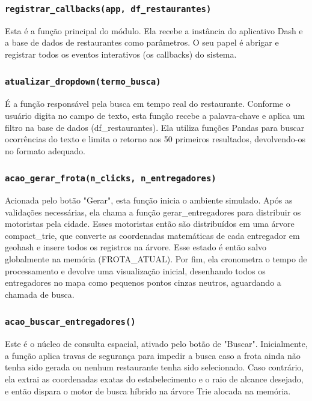 \documentclass[12pt,a4paper]{article}
\begin{document}
\subsubsection{\texttt{registrar\_callbacks(app, df\_restaurantes)}}
Esta é a função principal do módulo. Ela recebe a instância do aplicativo Dash e a base de dados de restaurantes como parâmetros. O seu papel é abrigar e registrar todos os eventos interativos (os callbacks) do sistema.

\subsubsection{\texttt{atualizar\_dropdown(termo\_busca)}}
É a função responsável pela busca em tempo real do restaurante. Conforme o usuário digita no campo de texto, esta função recebe a palavra-chave e aplica um filtro na base de dados (df\_restaurantes). Ela utiliza funções Pandas para buscar ocorrências do texto e limita o retorno aos 50 primeiros resultados, devolvendo-os no formato adequado.

\subsubsection{\texttt{acao\_gerar\_frota(n\_clicks, n\_entregadores)}}
Acionada pelo botão "Gerar", esta função inicia o ambiente simulado. Após as validações necessárias, ela chama a função gerar\_entregadores para distribuir os motoristas pela cidade. Esses motoristas então são distribuídos em uma árvore compact\_trie, que converte as coordenadas matemáticas de cada entregador em geohash e insere todos os registros na árvore. Esse estado é então salvo globalmente na memória (FROTA\_ATUAL). Por fim, ela cronometra o tempo de processamento e devolve uma visualização inicial, desenhando todos os entregadores no mapa como pequenos pontos cinzas neutros, aguardando a chamada de busca.

\subsubsection{\texttt{acao\_buscar\_entregadores()}}
Este é o núcleo de consulta espacial, ativado pelo botão de "Buscar". Inicialmente, a função aplica travas de segurança para impedir a busca caso a frota ainda não tenha sido gerada ou nenhum restaurante tenha sido selecionado. Caso contrário, ela extrai as coordenadas exatas do estabelecimento e o raio de alcance desejado, e então dispara o motor de busca híbrido na árvore Trie alocada na memória.
\end{document}
